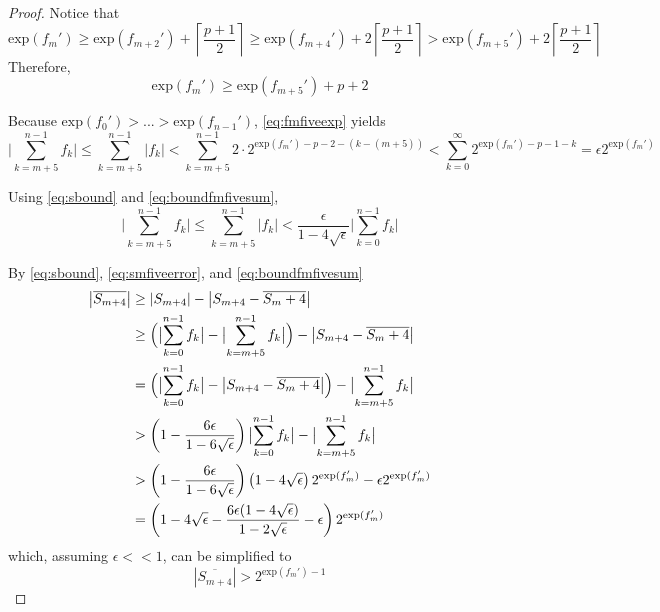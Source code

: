 \documentclass[12pt]{article}
\providecommand{\exp}{\ensuremath{\text{exp}}}
\theoremstyle{definition}
\numberwithin{equation}{section}
\numberwithin{figure}{section}
\begin{document}
\begin{proof}
      Notice that
        \begin{equation*}
          \exp(f_m') \geq \exp(f_{m + 2}') + \left\lceil\frac{p+ 1}{2}\right\rceil \geq \exp(f_{m + 4}') + 2  \left\lceil\frac{p + 1}{2}\right\rceil > \exp(f_{m + 5}')+ 2  \left\lceil\frac{p+ 1}{2}\right\rceil
        \end{equation*}
      Therefore,
        \begin{equation}
          \exp(f_m') \geq \exp(f_{m + 5}') + p + 2
          \label{eq:fmfiveexp}
        \end{equation}

      Because $\exp(f_0') > ... > \exp(f_{n - 1}')$, \eqref{eq:fmfiveexp} yields
        \begin{equation}
          \bigl|\sum\limits_{k = m + 5}^{n - 1} f_k\bigr| \leq \sum\limits_{k = m + 5}^{n - 1} |f_k| < \sum\limits_{k = m + 5}^{n - 1} 2 \cdot 2^{\exp(f_m') - p - 2 - (k - (m + 5))} < \sum\limits_{k = 0}^{\infty} 2^{\exp(f_m') - p - 1 - k} = \epsilon 2^{\exp(f_m')}
          \label{eq:boundfmfivesum}
        \end{equation}

      Using  \eqref{eq:sbound} and \eqref{eq:boundfmfivesum},
        \begin{equation}
          \bigl|\sum\limits_{k = m + 5}^{n - 1} f_k\bigr| \leq \sum\limits_{k = m + 5}^{n - 1} |f_k| < \frac{\epsilon}{1 - 4  \sqrt\epsilon}\bigl|\sum\limits_{k = 0}^{n - 1} f_k\bigr|
          \label{eq:relsboundfmfivesum}
        \end{equation}

      By  \eqref{eq:sbound}, \eqref{eq:smfiveerror}, and \eqref{eq:boundfmfivesum}
        \begin{align*}
          \left|\overline{S_{m + 4}}\right| &\geq |S_{m + 4}| - \left|S_{m + 4} - \overline{S_m + 4}\right| \nonumber \\
          &\geq \Bigl(\bigl|\sum\limits_{k = 0}^{n - 1} f_k\bigr| - \bigl|\sum\limits_{k = m + 5}^{n - 1}f_k\bigr|\Bigr) - \left|S_{m + 4} - \overline{S_m + 4}\right| \nonumber \\
          &= \Bigl(\bigl|\sum\limits_{k = 0}^{n - 1} f_k\bigr| - \left|S_{m + 4} - \overline{S_m + 4}\right|\Bigr) - \bigl|\sum\limits_{k = m + 5}^{n - 1}f_k\bigr| \nonumber \\
          &> \left(1 - \frac{6\epsilon}{1 - 6\sqrt\epsilon}\right)\bigl|\sum\limits_{k = 0}^{n - 1} f_k\bigr| - \bigl|\sum\limits_{k = m + 5}^{n - 1}f_k\bigr| \nonumber \\
          &> \left(1 - \frac{6\epsilon}{1 - 6\sqrt\epsilon}\right)\left(1 - 4 \sqrt\epsilon\right)2^{\exp(f_m')} - \epsilon2^{\exp(f_m')} \nonumber \\
          &= \left(1 - 4\sqrt\epsilon - \frac{6\epsilon(1 - 4\sqrt\epsilon)}{1 - 2\sqrt\epsilon} - \epsilon\right) 2^{\exp(f_m')}
        \end{align*}
        which, assuming $\epsilon << 1$, can be simplified to
        \begin{equation}
          \left|\overline{S_{m + 4}}\right| > 2^{\exp(f_m') - 1}
          \label{eq:minsmfoursimple}
        \end{equation}


\end{proof}
\end{document}
